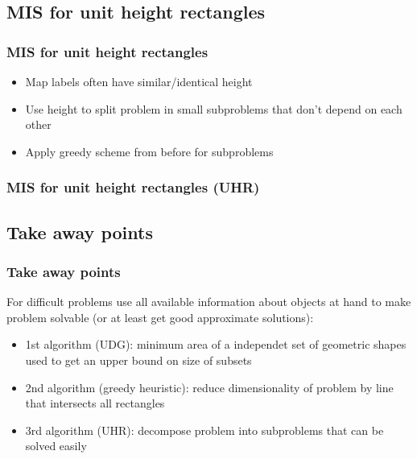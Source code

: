 \documentclass{beamer}
\begin{document}
\subsection{MIS for unit height rectangles}
\begin{frame}
\frametitle{MIS for unit height rectangles \cite{agarwallabel}}
\begin{itemize}[<+->]
\item Map labels often have similar/identical height
\item Use height to split problem in small subproblems that don't depend on each other
\item Apply greedy scheme from before for subproblems
\end{itemize}
\end{frame}

\begin{frame}
\frametitle{MIS for unit height rectangles (UHR)}
\end{frame}


\subsection{Take away points}
\begin{frame}
\frametitle{Take away points}
For difficult problems use all available information about objects at hand to make problem solvable (or at least get good approximate solutions):
\begin{itemize}
\item 1st algorithm (UDG): minimum area of a independet set of geometric shapes used to get an upper bound on size of subsets 
\item 2nd algorithm (greedy heuristic): reduce dimensionality of problem by line that intersects all rectangles
\item 3rd algorithm (UHR): decompose problem into subproblems that can be solved easily
\end{itemize}

\end{frame}
\end{document}

